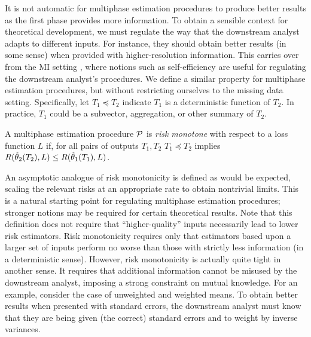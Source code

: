 It is not automatic for multiphase estimation procedures to produce better results as the first phase provides more information.
To obtain a sensible context for theoretical development, we must regulate the way that the downstream analyst adapts to different inputs.
For instance, they should obtain better results (in some sense) when provided with higher-resolution information.
This carries over from the MI  setting \citep{Meng1994,Meng2003,Meng2012,Xie2012}, where notions such as self-efficiency are useful for regulating the downstream analyst's procedures.
We define a similar property for multiphase estimation procedures, but without restricting  ourselves to the missing data setting. 
Specifically, let $T_1 \preceq T_2$ indicate $T_1$ is a deterministic function of $T_2$.
In practice, $T_1$ could be a subvector, aggregation, or other summary of $T_2$.
%
\begin{definition}
A multiphase estimation procedure $\mathcal{P}$ is \emph{risk monotone} with respect to a loss function $L$ if, for all pairs of outputs $T_1, T_2$ $T_1 \preceq T_2$ implies $R(\hat{\theta}_2(T_2), L) \leq R(\hat{\theta}_1(T_1), L)$.
\end{definition}
%
An asymptotic analogue of risk monotonicity is defined as would be expected, scaling the relevant risks at an appropriate rate to obtain nontrivial limits.
This is a natural starting point for regulating multiphase estimation procedures; stronger notions may be required for certain theoretical results.
Note that this definition does not require that ``higher-quality'' inputs necessarily lead to lower risk estimators.
Risk monotonicity requires only that estimators based upon a larger set of inputs perform no worse than those with strictly less information (in a deterministic sense).
However, risk monotonicity is actually quite tight in another sense.
It requires that additional information cannot be misused by the downstream analyst, imposing a strong constraint on mutual knowledge.
For an example, consider the case of unweighted and weighted means.
To obtain better results when presented with standard errors, the downstream analyst must know that they are being given (the correct) standard errors and to weight by inverse variances.

